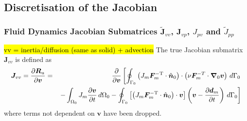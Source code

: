 \documentclass[sn-mathphys,Numbered]{sn-jnl}%
\newcommand{\bb}{\boldsymbol}
\begin{document}
\subsection{Discretisation of the Jacobian}

\subsubsection[Fluid Dynamics Jacobian Submatrices]{Fluid Dynamics Jacobian Submatrices $\tilde{\bb{J}}_{vv}$, $\bb{J}_{vp}$, $J_{pv}$ and $\tilde{J}_{pp}$}

\hl{vv = inertia/diffusion (same as solid) + advection}
The true Jacobian submatrix $\bb{J}_{vv}$ is defined as
\begin{eqnarray}
    \bb{J}_{vv} = \frac{\partial \bb{R}_u}{\partial \bb{v}}
    &=&
    	\frac{\partial}{\partial \bb{v}}
	\left[
	\oint_{\Gamma_0}  \left( J_m \bb{F}_m^{-\text{T}} \cdot \hat{\bb{n}}_0 \right)
		\cdot \left(\nu \bb{F}_m^{-T} \cdot \bb{\nabla}_0 \bb{v} \right) \, d\Gamma_0
	\right. \notag \\
	&& \left. 
	- \int_{\Omega_0} J_m \frac{\partial \bb{v}}{\partial t} \, d\Omega_0 
	- \oint_{\Gamma_0}  \left[ \left( J_m \bb{F}_m^{-\text{T}} \cdot \hat{\bb{n}}_0 \right) \cdot \bb{v} \right] \left(\bb{v} - \frac{\partial \bb{d}_m}{\partial t} \right) \, d\Gamma_0
	\right]
\end{eqnarray}
where terms not dependent on $\bb{v}$ have been dropped.
\end{document}
